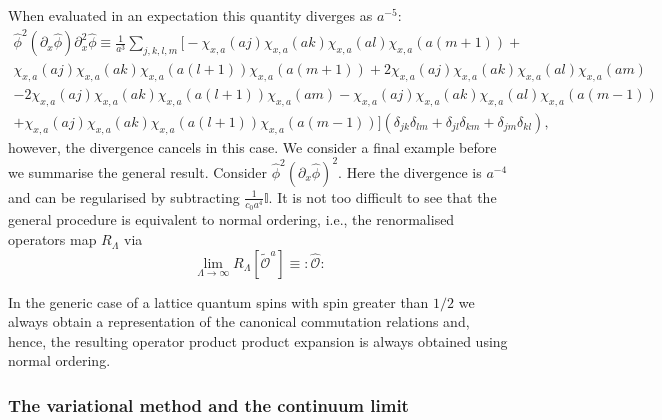 \documentclass[prl,twocolumn,lengthcheck,superscriptaddress]{revtex4-1}
\theoremstyle{definition}
\theoremstyle{remark}
\begin{document}
When evaluated in an expectation this quantity diverges as $a^{-5}$:
\begin{equation}
	\begin{split}
	\widehat{\phi}^2(\partial_x\widehat{\phi}) \partial_x^2\widehat{\phi} \equiv  \frac{1}{a^{3}}\sum_{j,k,l,m}\big[ -\chi_{x,a}(aj)\chi_{x,a}(ak)\chi_{x,a}(al)\chi_{x,a}(a(m+1))+\\ \chi_{x,a}(aj)\chi_{x,a}(ak)\chi_{x,a}(a(l+1))\chi_{x,a}(a(m+1))+2\chi_{x,a}(aj)\chi_{x,a}(ak)\chi_{x,a}(al)\chi_{x,a}(am)\\ -2\chi_{x,a}(aj)\chi_{x,a}(ak)\chi_{x,a}(a(l+1))\chi_{x,a}(am) -\chi_{x,a}(aj)\chi_{x,a}(ak)\chi_{x,a}(al)\chi_{x,a}(a(m-1))\\ + \chi_{x,a}(aj)\chi_{x,a}(ak)\chi_{x,a}(a(l+1))\chi_{x,a}(a(m-1))\big](\delta_{jk}\delta_{lm} + \delta_{jl}\delta_{km} + \delta_{jm}\delta_{kl}),
	\end{split}
\end{equation}
however, the divergence cancels in this case. We consider a final example before we summarise the general result. Consider $\widehat{\phi}^2(\partial_x\widehat{\phi})^2$. Here the divergence is $a^{-4}$ and can be regularised by subtracting $\frac{1}{c_0a^4}\mathbb{I}$. It is not too difficult to see that the general procedure is equivalent to normal ordering, i.e., the renormalised operators map $R_{\Lambda}$ via 
\begin{equation}
	\lim_{\Lambda\rightarrow \infty}R_\Lambda[\widetilde{\mathcal{O}}^{a}] \equiv {:}\widehat{\mathcal{O}}{:}
\end{equation}

In the generic case of a lattice quantum spins with spin greater than $1/2$ we always obtain a representation of the canonical commutation relations and, hence, the resulting operator product product expansion is always obtained using normal ordering. 

 



\subsubsection{The variational method and the continuum limit}
\end{document}
